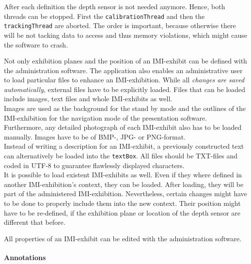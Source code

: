 After each definition the depth sensor is not needed anymore. Hence, both threads can be stopped. First the \texttt{calibrationThread} and then the \texttt{trackingThread} are aborted. The order is important, because otherwise there will be not tacking data to access and thus memory violations, which might cause the software to crash.

Not only exhibition planes and the position of an \ac{IMI}-exhibit can be defined with the administration software. The application also enables an administrative user to load particular files to enhance an \ac{IMI}-exhibition. While all \textit{changes are saved automatically}, external files have to be explicitly loaded. Files that can be loaded include images, text files and whole \ac{IMI}-exhibits as well.
\\
Images are used as the background for the stand by mode and the outlines of the \ac{IMI}-exhibition for the navigation mode of the presentation software. Furthermore, any detailed photograph of each \ac{IMI}-exhibit also has to be loaded manually. Images have to be of BMP-, JPG- or PNG-format.
\\
Instead of writing a description for an \ac{IMI}-exhibit, a previously constructed text can alternatively be loaded into the \texttt{textBox}. All files should be TXT-files and coded in UTF-8 to guarantee flawlessly displayed characters.
\\
It is possible to load existent \ac{IMI}-exhibits as well. Even if they where defined in another \ac{IMI}-exhibition's context, they can be loaded. After loading, they will be part of the administered \ac{IMI}-exhibition. Nevertheless, certain changes might have to be done to properly include them into the new context. Their position might have to be re-defined, if the exhibition plane or location of the depth sensor are different that before.

All properties of an \ac{IMI}-exhibit can be edited with the administration software. 

\paragraph{Annotations}


